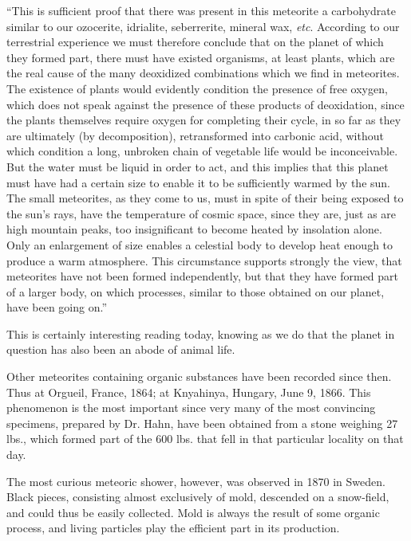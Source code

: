 \documentclass[a4paper, 12pt, oneside]{article}
\begin{document}
``This is sufficient proof that there was present in this meteorite a carbohydrate similar to our ozocerite, idrialite, seberrerite, mineral wax, \emph{etc}. According to our terrestrial experience we must therefore conclude that on the planet of which they formed part, there must have existed organisms, at least plants, which are the real cause of the many deoxidized combinations which we find in meteorites. The existence of plants would evidently condition the presence of free oxygen, which does not speak against the presence of these products of deoxidation, since the plants themselves require oxygen for completing their cycle, in so far as they are ultimately (by decomposition), retransformed into carbonic acid, without which condition a long, unbroken chain of vegetable life would be inconceivable. But the water must be liquid in order to act, and this implies that this planet must have had a certain size to enable it to be sufficiently warmed by the sun. The small meteorites, as they come to us, must in spite of their being exposed to the sun's rays, have the temperature of cosmic space, since they are, just as are high mountain peaks, too insignificant to become heated by insolation alone. Only an enlargement of size enables a celestial body to develop heat enough to produce a warm atmosphere. This circumstance supports strongly the view, that meteorites have not been formed independently, but that they have formed part of a larger body, on which processes, similar to those obtained on our planet, have been going on.''

This is certainly interesting reading today, knowing as we do that the planet in question has also been an abode of animal life.

Other meteorites containing organic substances have been recorded since then. Thus at Orgueil, France, 1864; at Knyahinya, Hungary, June 9, 1866. This phenomenon is the most important since very many of the most convincing specimens, prepared by Dr. Hahn, have been obtained from a stone weighing 27 lbs., which formed part of the 600 lbs. that fell in that particular locality on that day.

The most curious meteoric shower, however, was observed in 1870 in Sweden. Black pieces, consisting almost exclusively of mold, descended on a snow-field, and could thus be easily collected. Mold is always the result of some organic process, and living particles play the efficient part in its production.
\end{document}
